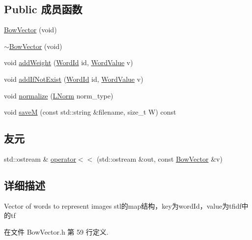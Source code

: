 \subsection*{Public 成员函数}
\begin{DoxyCompactItemize}
\item 
\hyperlink{classDBoW2_1_1BowVector_ac4da23e700adc4ee083d66b23ce86e90}{Bow\-Vector} (void)
\item 
\hyperlink{classDBoW2_1_1BowVector_a7210cac6ce006c7232f4d097faa338d0}{$\sim$\-Bow\-Vector} (void)
\item 
void \hyperlink{classDBoW2_1_1BowVector_a3ac92a805b252c93dc6535240d02df47}{add\-Weight} (\hyperlink{namespaceDBoW2_ab1a0d3283b2d4690a383372ed20bfeb5}{Word\-Id} id, \hyperlink{namespaceDBoW2_a55fcd7333e591a38e96b91f41bc182f6}{Word\-Value} v)
\item 
void \hyperlink{classDBoW2_1_1BowVector_a5ddf10e444d10425e5bd3568dc7ffe5e}{add\-If\-Not\-Exist} (\hyperlink{namespaceDBoW2_ab1a0d3283b2d4690a383372ed20bfeb5}{Word\-Id} id, \hyperlink{namespaceDBoW2_a55fcd7333e591a38e96b91f41bc182f6}{Word\-Value} v)
\item 
void \hyperlink{classDBoW2_1_1BowVector_acd2dd34023e3053a4cc75d70c8b6ac13}{normalize} (\hyperlink{namespaceDBoW2_a53e9e0bcfc25c861815e413a7cf3fa51}{L\-Norm} norm\-\_\-type)
\item 
void \hyperlink{classDBoW2_1_1BowVector_af15c4fde81b89e0f76a00337883b6b4a}{save\-M} (const std\-::string \&filename, size\-\_\-t W) const 
\end{DoxyCompactItemize}
\subsection*{友元}
\begin{DoxyCompactItemize}
\item 
std\-::ostream \& \hyperlink{classDBoW2_1_1BowVector_a1a7d9ac0f9128538859adfea38453ae1}{operator$<$$<$} (std\-::ostream \&out, const \hyperlink{classDBoW2_1_1BowVector}{Bow\-Vector} \&v)
\end{DoxyCompactItemize}


\subsection{详细描述}
Vector of words to represent images stl的map结构，key为word\-Id，value为tfidf中的tf 

在文件 Bow\-Vector.\-h 第 59 行定义.



